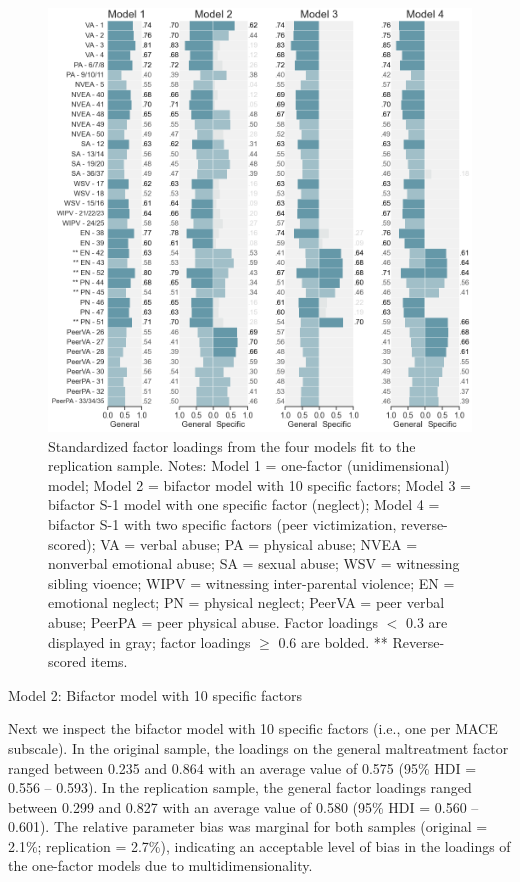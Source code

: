 \documentclass[letterpaper,man,natbib,longtable,floatsintext,12pt]{apa6}
\makeatletter
\renewcommand{\subsubsection}{\@startsection{subsubsection}{3}
  {\z@}%
  {\b@level@two@skip}{\e@level@two@skip}%
  {\normalfont\normalsize\bfseries}}
\makeatother
\begin{document}
\begin{figure}[tp]
    \centering
    \includegraphics[width=1.1\textwidth,center]{figures/fig03.png}
    \captionsetup{width=1.1\textwidth}
    \caption{Standardized factor loadings from the four models fit to the replication sample. Notes: Model 1 = one-factor (unidimensional) model; Model 2 = bifactor model with 10 specific factors; Model 3 = bifactor S-1 model with one specific factor (neglect); Model 4 = bifactor S-1 with two specific factors (peer victimization, reverse-scored); VA = verbal abuse; PA = physical abuse; NVEA = nonverbal emotional abuse; SA = sexual abuse; WSV = witnessing sibling vioence; WIPV = witnessing inter-parental violence; EN = emotional neglect; PN = physical neglect; PeerVA = peer verbal abuse; PeerPA = peer physical abuse. Factor loadings $<$ 0.3 are displayed in gray; factor loadings $\geq$ 0.6 are bolded.  ** Reverse-scored items.}
    \label{fig:loadings_online}
\end{figure}

\subsubsection{Model 2: Bifactor model with 10 specific factors}

Next we inspect the bifactor model with 10 specific factors (i.e., one per MACE subscale). In the original sample, the loadings on the general maltreatment factor ranged between 0.235 and 0.864 with an average value of 0.575 (95\% HDI = 0.556 -- 0.593). In the replication sample, the general factor loadings ranged between 0.299 and 0.827 with an average value of 0.580 (95\% HDI = 0.560 -- 0.601). The relative parameter bias was marginal for both samples (original = 2.1\%; replication = 2.7\%), indicating an acceptable level of bias in the loadings of the one-factor models due to multidimensionality.  
\end{document}
